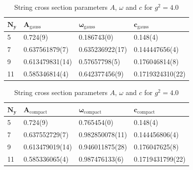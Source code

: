 \begin{table}[!hb]
\centering
\begin{tabular}{llll}
    $\mathbf{N_y}$ & $\mathbf{A_\mathrm{gauss}}$ & $\mathbf{\omega_\mathrm{gauss}}$ & $\mathbf{c_\mathrm{gauss}}$ \\ \hline
   5 & 0.724(9) & 0.186743(0) & 0.148(4) \\
   7 & 0.637561879(7) & 0.635236922(17) & 0.144447656(4) \\
   9 & 0.613479831(14) & 0.57657798(5) & 0.176046814(8) \\
   11 & 0.585346814(4) & 0.642377456(9) & 0.1719324310(22) \\
\end{tabular}
\begin{tabular}{llll}
    $\mathbf{N_y}$ & $\mathbf{A_\mathrm{compact}}$ & $\mathbf{\omega_\mathrm{compact}}$ & $\mathbf{c_\mathrm{compact}}$ \\ \hline
   5 & 0.724(9) & 0.765454(0) & 0.148(4) \\
   7 & 0.637552729(7) & 0.982850078(11) & 0.144456806(4) \\
   9 & 0.613479019(14) & 0.946011875(28) & 0.176047625(8) \\
   11 & 0.585336065(4) & 0.987476133(6) & 0.1719431799(22) \\
\end{tabular}
\caption{String cross section parameters $A$, $\omega$ and $c$ for $g^2=4.0$}
\end{table}

